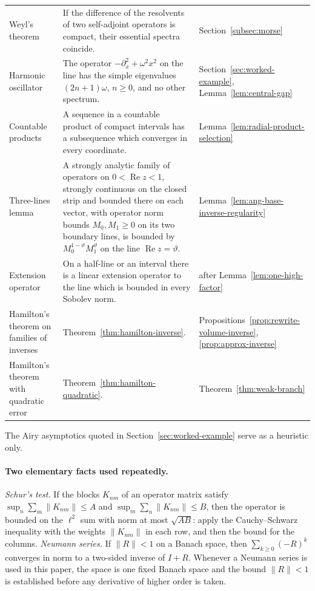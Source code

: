 \begin{longtable}{@{}p{.21\linewidth}p{.47\linewidth}p{.25\linewidth}@{}}
Weyl's theorem \cite[Theorem~6.19]{Teschl2009} &
 If the difference of the resolvents of two self-adjoint operators
 is compact, their essential spectra coincide. &
 Section~\ref{subsec:morse}\\
Harmonic oscillator \cite[Section~8.3]{Teschl2009} &
 The operator $-\partial_x^2+\omega^2x^2$ on the line has the simple
 eigenvalues $(2n+1)\omega$, $n\ge0$, and no other spectrum. &
 Section~\ref{sec:worked-example},
 Lemma~\ref{lem:central-gap}\\
Countable products &
 A sequence in a countable product of compact intervals has a
 subsequence which converges in every coordinate. &
 Lemma~\ref{lem:radial-product-selection}\\
Three-lines lemma &
 A strongly analytic family of operators on $0<\operatorname{Re}z<1$,
 strongly continuous on the closed strip and bounded there on each
 vector, with operator norm bounds $M_0,M_1\ge0$ on its two boundary
 lines, is bounded by
 $M_0^{1-\vartheta}M_1^{\vartheta}$ on the line
 $\operatorname{Re}z=\vartheta$. &
 Lemma~\ref{lem:ang-base-inverse-regularity}\\
Extension operator &
 On a half-line or an interval there is a linear extension operator
 to the line which is bounded in every Sobolev norm. &
 after Lemma~\ref{lem:one-high-factor}\\
Hamilton's theorem on families of inverses &
 Theorem~\ref{thm:hamilton-inverse}. &
 Propositions~\ref{prop:rewrite-volume-inverse},
 \ref{prop:approx-inverse}\\
Hamilton's theorem with quadratic error &
 Theorem~\ref{thm:hamilton-quadratic}. &
 Theorem~\ref{thm:weak-branch}\\
\bottomrule
\end{longtable}

The Airy asymptotics \cite{DLMFAiry} quoted in
Section~\ref{sec:worked-example} serve as a heuristic only.

\paragraph{Two elementary facts used repeatedly.}
\emph{Schur's test.} If the blocks $K_{nm}$ of an operator matrix
satisfy $\sup_n\sum_m\|K_{nm}\|\le A$ and
$\sup_m\sum_n\|K_{nm}\|\le B$, then the operator is bounded on the
$\ell^2$ sum with norm at most $\sqrt{AB}$: apply the Cauchy--Schwarz
inequality with the weights $\|K_{nm}\|$ in each row, and then the
bound for the columns. \emph{Neumann series.} If $\|R\|<1$ on a
Banach space, then $\sum_{k\ge0}(-R)^k$ converges in norm to a
two-sided inverse of $I+R$. Whenever a Neumann series is used in this
paper, the space is one fixed Banach space and the bound $\|R\|<1$ is
established before any derivative of higher order is taken.

